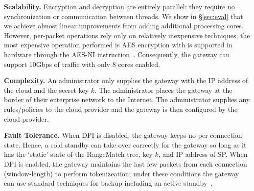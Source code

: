 \noindent\textbf{Scalability.}
Encryption and decryption are entirely parallel: they require no synchronization or communication between threads. We show in \S\ref{sec:eval} that we achieve almost linear improvements from adding additional processing cores.
However, per-packet operations rely only on relatively inexpensive techniques; the most expensive operation performed is AES encryption with is supported in hardware through the AES-NI instruction~\cite{aes-ni}. 
Consequently, the gateway can support 10Gbps of traffic with only 8 cores enabled.

\noindent\textbf{Complexity.}
An administrator only supplies the gateway with the IP address of the cloud and the secret key $k$.
The administrator places the gateway at the border of their enterprise network to the Internet.
The administrator supplies any rules/policies to the cloud provider and the gateway is then configured by the cloud provider.

\noindent\textbf{Fault Tolerance.}
When DPI is disabled, the gateway keeps no per-connection state. Hence, a cold standby can take over correctly for the gateway so long as it has the `static' state of the RangeMatch tree, key $k$, and IP address of SP.
When DPI is enabled, the gateway maintains the last few packets from each connection (window-length) to perform tokenizeation; under these conditions the gateway can use standard techniques for backup including an active standby~\cite{colo}.
